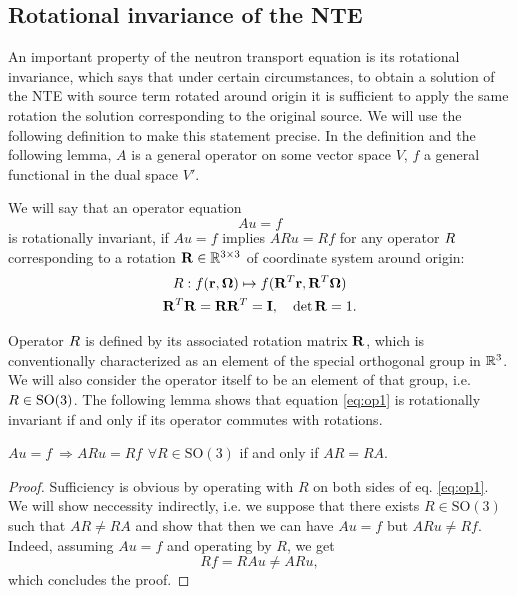 \subsection{Rotational invariance of the NTE}
An important property of the neutron transport equation is its rotational invariance, which says that under certain
circumstances, to obtain a solution of the NTE with source term rotated around origin it is sufficient to apply the same
rotation the solution corresponding to the original source. We will use the following definition to make this
statement precise. In the definition and the following lemma, $A$ is a general operator on some vector space $V$, $f$ a
general functional in the dual space $V'$.
 
\begin{definition}
We will say that an
operator equation
\begin{equation}\label{eq:op1} 
Au = f
\end{equation}
is rotationally invariant, if $Au = f$ implies $ARu = Rf$ for any operator
$\op{R}$ corresponding to a rotation $\mat{R}\in\R[3\times3]$ of coordinate system around origin:
\begin{equation}\label{eq:def_rot}
\begin{gathered}
\op{R}: f(\br,\bomega) \mapsto f(\mat{R}^T\br,\mat{R}^T\bomega)\\
\mat{R}^T\mat{R} = \mat{R}\mat{R}^T = \mat{I},\quad \det \mat{R} = 1.
\end{gathered}
\end{equation}
\end{definition}
Operator $\op{R}$ is defined by its associated rotation matrix $\mat{R}$, which is conventionally
characterized as an element of the special orthogonal group in $\R[3]$. We will also
consider the operator itself to be an element of that group, i.e.
$\op{R} \in \mathrm{SO}(3)$. The following lemma shows that equation \eqref{eq:op1} is rotationally invariant if and
only if its operator commutes with rotations.
\begin{lemma}\label{lemma1}
	$Au = f \ \Rightarrow ARu = Rf\,\ \forall R\in \mathrm{SO}(3)$ if and only if $AR = RA$.
\end{lemma}
\begin{proof}
	Sufficiency is obvious by operating with $R$ on both sides of eq. \eqref{eq:op1}.
	We will show neccessity indirectly, i.e. we suppose that there exists $R\in\mathrm{SO}(3)$ such that $AR \neq RA$
	and show that then we can have $Au = f$ but $ARu \neq Rf$. Indeed, assuming $Au = f$ and operating by $R$, we get  
	$$
		Rf = RAu \neq ARu,
	$$
	which concludes the proof.
\end{proof}

